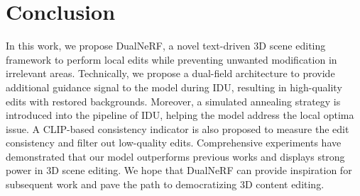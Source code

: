 \section{Conclusion}
In this work, we propose DualNeRF, a novel text-driven 3D scene editing framework to perform local edits while preventing unwanted modification in irrelevant areas. Technically, we propose a dual-field architecture to provide additional guidance signal to the model during IDU, resulting in high-quality edits with restored backgrounds. Moreover, a simulated annealing strategy is introduced into the pipeline of IDU, helping the model address the local optima issue. A CLIP-based consistency indicator is also proposed to measure the edit consistency and filter out low-quality edits. Comprehensive experiments have demonstrated that our model outperforms previous works and displays strong power in 3D scene editing. We hope that DualNeRF can provide inspiration for subsequent work and pave the path to democratizing 3D content editing.
